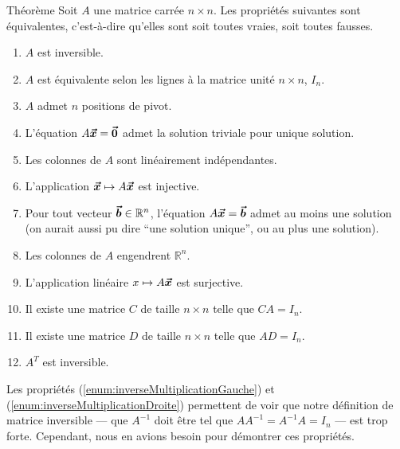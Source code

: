 \documentclass[a4paper]{article}
\begin{document}
\begin{parag}{Théorème}
    Soit $A$ une matrice carrée $n \times n$. Les propriétés suivantes sont équivalentes, c'est-à-dire qu'elles sont soit toutes vraies, soit toutes fausses.
    \begin{enumerate}
        \item $A$ est inversible.
        \item $A$ est équivalente selon les lignes à la matrice unité $n \times n$, $I_n$.
        \item $A$ admet $n$ positions de pivot.
        \item L'équation $A \bm{\protect\vec{x}} = \bm{\protect\vec{0}}$ admet la solution triviale pour unique solution.
        \item Les colonnes de $A$ sont linéairement indépendantes.
        \item L'application $\bm{\protect\vec{x}} \mapsto A \bm{\protect\vec{x}}$ est injective.
        \item Pour tout vecteur $\bm{\protect\vec{b}} \in \mathbb{R}^{n}$, l'équation $A \bm{\protect\vec{x}} = \bm{\protect\vec{b}}$ admet au moins une solution (on aurait aussi pu dire ``une solution unique'', ou au plus une solution).
        \item Les colonnes de $A$ engendrent $\mathbb{R}^{n}$.
        \item L'application linéaire $x \mapsto A \bm{\protect\vec{x}}$ est surjective.
        \item\label{enum:inverseMultiplicationGauche} Il existe une matrice $C$ de taille $n \times n$ telle que $CA = I_n$.
        \item\label{enum:inverseMultiplicationDroite} Il existe une matrice $D$ de taille $n \times n$ telle que $AD = I_n$.
        \item $A^T$ est inversible.
    \end{enumerate}

    Les propriétés (\ref{enum:inverseMultiplicationGauche}) et (\ref{enum:inverseMultiplicationDroite}) permettent de voir que notre définition de matrice inversible --- que $A^{-1}$ doit être tel que $A A^{-1} = A^{-1} A = I_n$ --- est trop forte. Cependant, nous en avions besoin pour démontrer ces propriétés.
\end{parag}
\end{document}
